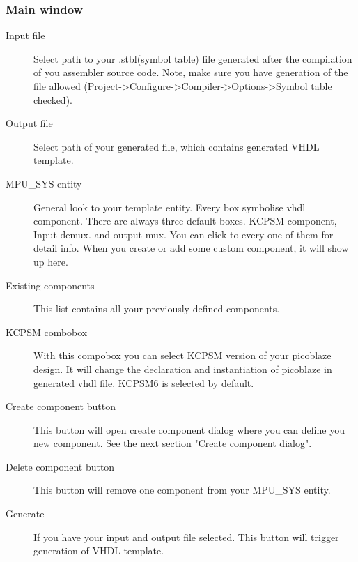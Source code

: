 \subsubsection{Main window}
    \begin{description}
        \item [Input file]
            Select path to your .stbl(symbol table) file generated after the compilation of you assembler source code. Note, make sure you
            have generation of the file allowed (Project->Configure->Compiler->Options->Symbol table checked).
        \item [Output file]
            Select path of your generated file, which contains generated VHDL template.
        \item [MPU\_SYS entity]
            General look to your template entity. Every box symbolise vhdl component. There are always three default boxes. KCPSM component, Input demux.
            and output mux. You can click to every one of them for detail info. When you create or add some custom component, it will show
            up here.
        \item [Existing components]
            This list contains all your previously defined components.
        \item [KCPSM combobox]
            With this compobox you can select KCPSM version of your picoblaze design. It will change the declaration and instantiation of picoblaze
            in generated vhdl file. KCPSM6 is selected by default.
        \item [Create component button]
            This button will open create component dialog where you can define you new component. See the next section "Create component dialog".
        \item [Delete component button]
            This button will remove one component from your MPU\_SYS entity.
        \item [Generate]
            If you have your input and output file selected. This button will trigger generation of VHDL template.
    \end{description}

